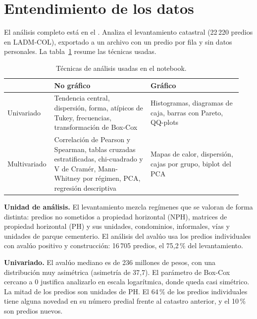 \documentclass[12pt,letterpaper]{article}
\begin{document}
\section{Entendimiento de los datos} %
El análisis completo está en el
. Analiza el levantamiento catastral (22\,220 predios en LADM-COL), exportado a un archivo
con un predio por fila y sin datos personales. La tabla~\ref{tab:tecnicas} resume las técnicas
usadas.

\begin{table}[ht]
  \centering
  \caption{Técnicas de análisis usadas en el notebook.}
  \label{tab:tecnicas}
  \small
  \begin{tabular}{@{}>{\raggedright\arraybackslash}p{0.16\linewidth}
                     >{\raggedright\arraybackslash}p{0.40\linewidth}
                     >{\raggedright\arraybackslash}p{0.38\linewidth}@{}}
    \toprule
     & No gráfico & Gráfico \\
    \midrule
    Univariado & Tendencia central, dispersión, forma, atípicos de Tukey, frecuencias,
      transformación de Box-Cox & Histogramas, diagramas de caja, barras con Pareto, QQ-plots \\
    Multivariado & Correlación de Pearson y Spearman, tablas cruzadas estratificadas,
      chi-cuadrado y V de Cramér, Mann-Whitney por régimen, PCA, regresión descriptiva
      & Mapas de calor, dispersión, cajas por grupo, biplot del PCA \\
    \bottomrule
  \end{tabular}
\end{table}

\textbf{Unidad de análisis.} El levantamiento mezcla regímenes que se valoran de forma
distinta: predios no sometidos a propiedad horizontal (NPH), matrices de propiedad horizontal
(PH) y sus unidades, condominios, informales, vías y unidades de parque cementerio. El análisis
del avalúo usa los predios individuales con avalúo positivo y construcción: 16\,705 predios, el
75,2\,\% del levantamiento.

\textbf{Univariado.} El avalúo mediano es de 236 millones de pesos, con una distribución muy
asimétrica (asimetría de 37,7). El parámetro de Box-Cox cercano a 0 justifica analizarlo en
escala logarítmica, donde queda casi simétrico. La mitad de los predios son unidades de PH. El
64\,\% de los predios individuales tiene alguna novedad en su número predial frente al catastro
anterior, y el 10\,\% son predios nuevos.
\end{document}

